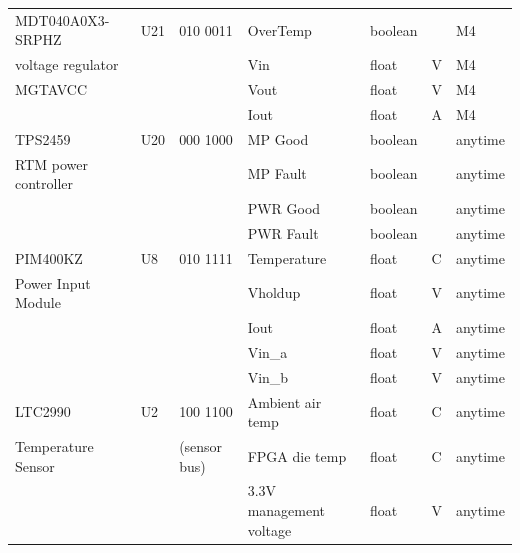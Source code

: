 \documentclass[letterpaper]{article}
\begin{document}
\begin{table}[htp]
\begin{tabular}{|l|l|l|l|l|l|l|}
\hline
MDT040A0X3-SRPHZ&U21&010 0011&OverTemp&boolean&&M4 \\ \cline{4-7}
voltage regulator&&&Vin&float&V&M4 \\ \cline{4-7}
MGTAVCC&&&Vout&float&V&M4 \\ \cline{4-7}
&&&Iout&float&A&M4 \\ \hline
\hline
TPS2459&U20&000 1000&MP Good&boolean&&anytime \\ \cline{4-7}
RTM power controller&&&MP Fault&boolean&&anytime \\ \cline{4-7}
&&&PWR Good&boolean&&anytime \\ \cline{4-7}
&&&PWR Fault&boolean&&anytime \\ \hline
\hline
PIM400KZ&U8&010 1111&Temperature&float&C&anytime \\ \cline{4-7}
Power Input Module&&&Vholdup&float&V&anytime \\ \cline{4-7}
&&&Iout&float&A&anytime \\ \cline{4-7}
&&&Vin\_a&float&V&anytime \\ \cline{4-7}
&&&Vin\_b&float&V&anytime \\ \hline
\hline
LTC2990&U2&100 1100&Ambient air temp&float&C&anytime \\ \cline{4-7}
Temperature Sensor&&(sensor bus)&FPGA die temp&float&C&anytime \\ \cline{4-7}
&&&3.3V management voltage&float&V&anytime \\ \hline
\end{tabular}
\end{table}
\end{document}

